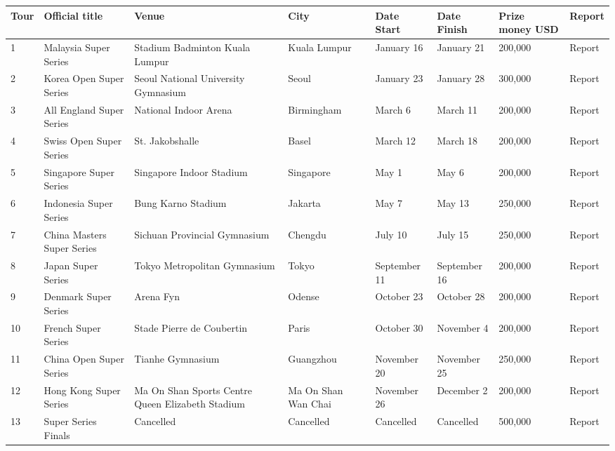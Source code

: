\documentclass{article}
\begin{document}
\begin{tabular}{llllllll}
\toprule
Tour & Official title & Venue & City & Date Start & Date Finish & Prize money USD & Report \\
\midrule
1 & Malaysia Super Series & Stadium Badminton Kuala Lumpur & Kuala Lumpur & January 16 & January 21 & 200,000 & Report \\
2 & Korea Open Super Series & Seoul National University Gymnasium & Seoul & January 23 & January 28 & 300,000 & Report \\
3 & All England Super Series & National Indoor Arena & Birmingham & March 6 & March 11 & 200,000 & Report \\
4 & Swiss Open Super Series & St. Jakobshalle & Basel & March 12 & March 18 & 200,000 & Report \\
5 & Singapore Super Series & Singapore Indoor Stadium & Singapore & May 1 & May 6 & 200,000 & Report \\
6 & Indonesia Super Series & Bung Karno Stadium & Jakarta & May 7 & May 13 & 250,000 & Report \\
7 & China Masters Super Series & Sichuan Provincial Gymnasium & Chengdu & July 10 & July 15 & 250,000 & Report \\
8 & Japan Super Series & Tokyo Metropolitan Gymnasium & Tokyo & September 11 & September 16 & 200,000 & Report \\
9 & Denmark Super Series & Arena Fyn & Odense & October 23 & October 28 & 200,000 & Report \\
10 & French Super Series & Stade Pierre de Coubertin & Paris & October 30 & November 4 & 200,000 & Report \\
11 & China Open Super Series & Tianhe Gymnasium & Guangzhou & November 20 & November 25 & 250,000 & Report \\
12 & Hong Kong Super Series & Ma On Shan Sports Centre Queen Elizabeth Stadium & Ma On Shan Wan Chai & November 26 & December 2 & 200,000 & Report \\
13 & Super Series Finals & Cancelled & Cancelled & Cancelled & Cancelled & 500,000 & Report \\
\bottomrule
\end{tabular}
\end{document}
